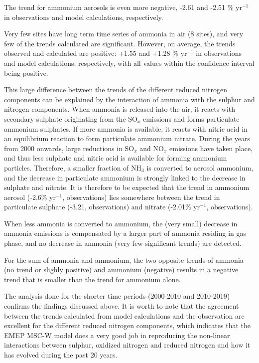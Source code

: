 The trend for ammonium aerosols is even more negative, -2.61 and -2.51 \% yr$^{-1}$ in observations and model calculations, respectively.

Very few sites have long term time series of ammonia in air (8 sites), and very few of the trends calculated are significant. However, on average, the trends observed and calculated are positive: +1.55 and +1.28 \% yr$^{-1}$ in observations and model calculations, respectively, with all values within the confidence interval being positive.

This large difference between the trends of the different reduced nitrogen components can be explained by the interaction of ammonia with the sulphur and nitrogen components. When ammonia is released into the air, it reacts with secondary sulphate originating from the SO$_x$ emissions and forms particulate ammonium sulphates. If more ammonia is available, it reacts with nitric acid in an equilibrium reaction to form particulate ammonium nitrate. During the years from 2000 onwards, large reductions in SO$_x$ and NO$_x$ emissions have taken place, and thus less sulphate and nitric acid is available for forming ammonium particles. Therefore, a smaller fraction of NH$_3$ is converted to aerosol ammonium, and the decrease in particulate ammonium is strongly linked to the decrease in sulphate and nitrate. It is therefore to be expected that the trend in ammonium aerosol (-2.6\% yr$^{-1}$, observations) lies somewhere between the trend in particulate sulphate (-3.21, observations) and nitrate (-2.01\% yr$^{-1}$, observations). 

When less ammonia is converted to ammonium, the (very small) decrease in ammonia emissions is compensated by a larger part of ammonia residing in gas phase, and no decrease in ammonia (very few significant trends) are detected.

For the sum of ammonia and ammonium, the two opposite trends of ammonia (no trend or slighly positive) and ammonium (negative) results in a negative trend that is smaller than the trend for ammonium alone.



The analysis done for the shorter time periods (2000-2010 and 2010-2019) confirms the findings discussed above. It is worth to note that the agreement between the trends calculated from model calculations and the observation are excellent for the different reduced nitrogen components, which indicates that the EMEP MSC-W model does a very good job in reproducing the non-linear interactions between sulphur, oxidized nitrogen and reduced nitrogen and how it has evolved during the past 20 years.

